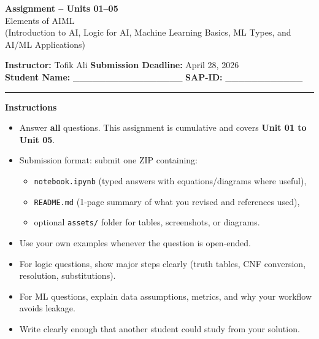 \documentclass[11pt,a4paper]{article}
\newcommand{\SubmissionDeadline}{April 28, 2026}
\begin{document}
\begin{center}
  {\LARGE \textbf{Assignment -- Units 01--05}}\\[0.25em]
  {\large Elements of AIML}\\[0.25em]
  \normalsize (Introduction to AI, Logic for AI, Machine Learning Basics, ML Types, and AI/ML Applications)
\end{center}

\noindent
\textbf{Instructor:} Tofik Ali \hfill \textbf{Submission Deadline:} \SubmissionDeadline\\
\textbf{Student Name:} \_\_\_\_\_\_\_\_\_\_\_\_\_\_\_\_\_ \hfill \textbf{SAP-ID:} \_\_\_\_\_\_\_\_\_\_\_\_\\

\vspace{0.6em}
\hrule
\vspace{0.8em}

\textbf{Instructions}
\begin{itemize}[leftmargin=*]
  \item Answer \textbf{all} questions. This assignment is cumulative and covers \textbf{Unit 01 to Unit 05}.
  \item Submission format: submit one ZIP containing:
    \begin{itemize}[leftmargin=*]
      \item \texttt{notebook.ipynb} (typed answers with equations/diagrams where useful),
      \item \texttt{README.md} (1-page summary of what you revised and references used),
      \item optional \texttt{assets/} folder for tables, screenshots, or diagrams.
    \end{itemize}
  \item Use your own examples whenever the question is open-ended.
  \item For logic questions, show major steps clearly (truth tables, CNF conversion, resolution, substitutions).
  \item For ML questions, explain data assumptions, metrics, and why your workflow avoids leakage.
  \item Write clearly enough that another student could study from your solution.
\end{itemize}

\vspace{0.6em}
\end{document}
